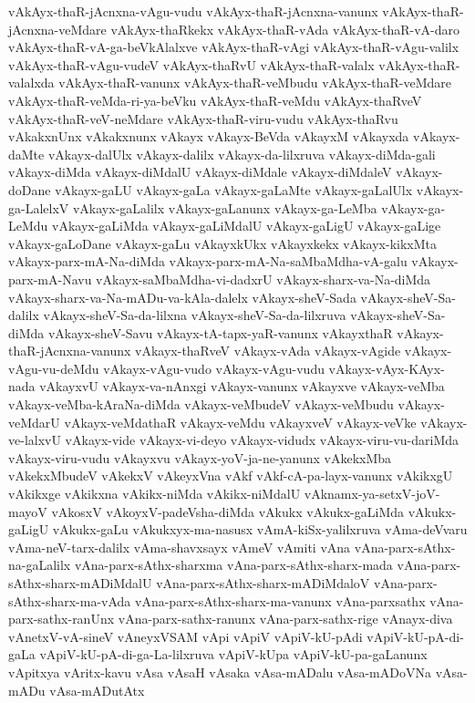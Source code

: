 {vAkAyx-thaR-jAcnxna-vAgu-vudu
vAkAyx-thaR-jAcnxna-vanunx
vAkAyx-thaR-jAcnxna-veMdare
vAkAyx-thaRkekx
vAkAyx-thaR-vAda
vAkAyx-thaR-vA-daro
vAkAyx-thaR-vA-ga-beVkAlalxve
vAkAyx-thaR-vAgi
vAkAyx-thaR-vAgu-valilx
vAkAyx-thaR-vAgu-vudeV
vAkAyx-thaRvU
vAkAyx-thaR-valalx
vAkAyx-thaR-valalxda
vAkAyx-thaR-vanunx
vAkAyx-thaR-veMbudu
vAkAyx-thaR-veMdare
vAkAyx-thaR-veMda-ri-ya-beVku
vAkAyx-thaR-veMdu
vAkAyx-thaRveV
vAkAyx-thaR-veV-neMdare
vAkAyx-thaR-viru-vudu
vAkAyx-thaRvu
vAkakxnUnx
vAkakxnunx
vAkayx
vAkayx-BeVda
vAkayxM
vAkayxda
vAkayx-daMte
vAkayx-dalUlx
vAkayx-dalilx
vAkayx-da-lilxruva
vAkayx-diMda-gali
vAkayx-diMda
vAkayx-diMdalU
vAkayx-diMdale
vAkayx-diMdaleV
vAkayx-doDane
vAkayx-gaLU
vAkayx-gaLa
vAkayx-gaLaMte
vAkayx-gaLalUlx
vAkayx-ga-LalelxV
vAkayx-gaLalilx
vAkayx-gaLanunx
vAkayx-ga-LeMba
vAkayx-ga-LeMdu
vAkayx-gaLiMda
vAkayx-gaLiMdalU
vAkayx-gaLigU
vAkayx-gaLige
vAkayx-gaLoDane
vAkayx-gaLu
vAkayxkUkx
vAkayxkekx
vAkayx-kikxMta
vAkayx-parx-mA-Na-diMda
vAkayx-parx-mA-Na-saMbaMdha-vA-galu
vAkayx-parx-mA-Navu
vAkayx-saMbaMdha-vi-dadxrU
vAkayx-sharx-va-Na-diMda
vAkayx-sharx-va-Na-mADu-va-kAla-dalelx
vAkayx-sheV-Sada
vAkayx-sheV-Sa-dalilx
vAkayx-sheV-Sa-da-lilxna
vAkayx-sheV-Sa-da-lilxruva
vAkayx-sheV-Sa-diMda
vAkayx-sheV-Savu
vAkayx-tA-tapx-yaR-vanunx
vAkayxthaR
vAkayx-thaR-jAcnxna-vanunx
vAkayx-thaRveV
vAkayx-vAda
vAkayx-vAgide
vAkayx-vAgu-vu-deMdu
vAkayx-vAgu-vudo
vAkayx-vAgu-vudu
vAkayx-vAyx-KAyx-nada
vAkayxvU
vAkayx-va-nAnxgi
vAkayx-vanunx
vAkayxve
vAkayx-veMba
vAkayx-veMba-kAraNa-diMda
vAkayx-veMbudeV
vAkayx-veMbudu
vAkayx-veMdarU
vAkayx-veMdathaR
vAkayx-veMdu
vAkayxveV
vAkayx-veVke
vAkayx-ve-lalxvU
vAkayx-vide
vAkayx-vi-deyo
vAkayx-vidudx
vAkayx-viru-vu-dariMda
vAkayx-viru-vudu
vAkayxvu
vAkayx-yoV-ja-ne-yanunx
vAkekxMba
vAkekxMbudeV
vAkekxV
vAkeyxVna
vAkf
vAkf-cA-pa-layx-vanunx
vAkikxgU
vAkikxge
vAkikxna
vAkikx-niMda
vAkikx-niMdalU
vAknamx-ya-setxV-joV-mayoV
vAkosxV
vAkoyxV-padeVsha-diMda
vAkukx
vAkukx-gaLiMda
vAkukx-gaLigU
vAkukx-gaLu
vAkukxyx-ma-nasusx
vAmA-kiSx-yalilxruva
vAma-deVvaru
vAma-neV-tarx-dalilx
vAma-shavxsayx
vAmeV
vAmiti
vAna
vAna-parx-sAthx-na-gaLalilx
vAna-parx-sAthx-sharxma
vAna-parx-sAthx-sharx-mada
vAna-parx-sAthx-sharx-mADiMdalU
vAna-parx-sAthx-sharx-mADiMdaloV
vAna-parx-sAthx-sharx-ma-vAda
vAna-parx-sAthx-sharx-ma-vanunx
vAna-parxsathx
vAna-parx-sathx-ranUnx
vAna-parx-sathx-ranunx
vAna-parx-sathx-rige
vAnayx-diva
vAnetxV-vA-sineV
vAneyxVSAM
vApi
vApiV
vApiV-kU-pAdi
vApiV-kU-pA-di-gaLa
vApiV-kU-pA-di-ga-La-lilxruva
vApiV-kUpa
vApiV-kU-pa-gaLanunx
vApitxya
vAritx-kavu
vAsa
vAsaH
vAsaka
vAsa-mADalu
vAsa-mADoVNa
vAsa-mADu
vAsa-mADutAtx
}
